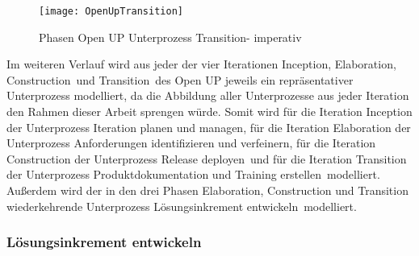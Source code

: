 \begin{figure}[H]
\begin{center}
  \texttt{[image: OpenUpTransition]} %
  \caption{Phasen Open UP Unterprozess Transition- imperativ}
  \label{fig:OpenUpTransition}
\end{center}
\end{figure}



Im weiteren Verlauf wird aus jeder der vier Iterationen \grqq Inception\grqq, \grqq Elaboration\grqq, \grqq Construction\grqq \  und \grqq Transition\grqq \  des Open UP jeweils ein repräsentativer Unterprozess modelliert, da die Abbildung aller Unterprozesse aus jeder Iteration den Rahmen dieser Arbeit sprengen würde. \newline
Somit wird für die Iteration Inception der Unterprozess \grqq Iteration planen und managen\grqq, für die Iteration Elaboration der Unterprozess \grqq Anforderungen identifizieren und verfeinern\grqq, für die Iteration Construction der Unterprozess \grqq Release deployen\grqq \ und für die Iteration Transition der Unterprozess \grqq Produktdokumentation und Training erstellen\grqq \ modelliert. Außerdem wird der in den drei Phasen Elaboration, Construction und Transition wiederkehrende Unterprozess \grqq Lösungsinkrement entwickeln\grqq \ modelliert.

\subsubsection{Lösungsinkrement entwickeln}

